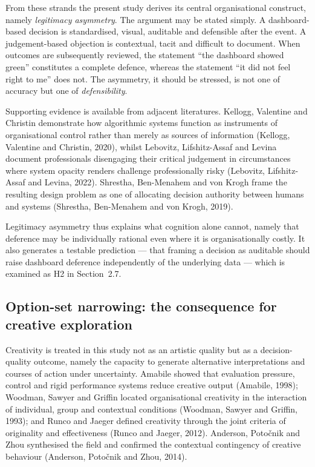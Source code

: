 \documentclass[11pt,a4paper]{article}
\numberwithin{figure}{section}
\numberwithin{table}{section}
\newcommand{\ct}[1]{\textcolor{citeblue}{#1}}          %
\newcommand{\xref}[1]{\textcolor{citeblue}{#1}}         %
\begin{document}
From these strands the present study derives its central organisational construct, namely
\emph{legitimacy asymmetry}. The argument may be stated simply. A dashboard-based decision is
standardised, visual, auditable and defensible after the event. A judgement-based objection is
contextual, tacit and difficult to document. When outcomes are subsequently reviewed, the statement
``the dashboard showed green'' constitutes a complete defence, whereas the statement ``it did not
feel right to me'' does not. The asymmetry, it should be stressed, is not one of accuracy but one
of \emph{defensibility}.

Supporting evidence is available from adjacent literatures. Kellogg, Valentine and Christin
demonstrate how algorithmic systems function as instruments of organisational control rather than
merely as sources of information \ct{(Kellogg, Valentine and Christin, 2020)}, whilst Lebovitz,
Lifshitz-Assaf and Levina document professionals disengaging their critical judgement in
circumstances where system opacity renders challenge professionally risky \ct{(Lebovitz,
Lifshitz-Assaf and Levina, 2022)}. Shrestha, Ben-Menahem and von Krogh frame the resulting design
problem as one of allocating decision authority between humans and systems \ct{(Shrestha,
Ben-Menahem and von Krogh, 2019)}.

Legitimacy asymmetry thus explains what cognition alone cannot, namely that deference may be
individually rational even where it is organisationally costly. It also generates a testable
prediction --- that framing a decision as auditable should raise dashboard deference independently
of the underlying data --- which is examined as H2 in \xref{Section~2.7}.

\subsection{Option-set narrowing: the consequence for creative exploration}

Creativity is treated in this study not as an artistic quality but as a decision-quality outcome,
namely the capacity to generate alternative interpretations and courses of action under
uncertainty. Amabile showed that evaluation pressure, control and rigid performance systems reduce
creative output \ct{(Amabile, 1998)}; Woodman, Sawyer and Griffin located organisational creativity
in the interaction of individual, group and contextual conditions \ct{(Woodman, Sawyer and Griffin,
1993)}; and Runco and Jaeger defined creativity through the joint criteria of originality and
effectiveness \ct{(Runco and Jaeger, 2012)}. Anderson, Potočnik and Zhou synthesised the field and
confirmed the contextual contingency of creative behaviour \ct{(Anderson, Potočnik and Zhou,
2014)}.
\end{document}
